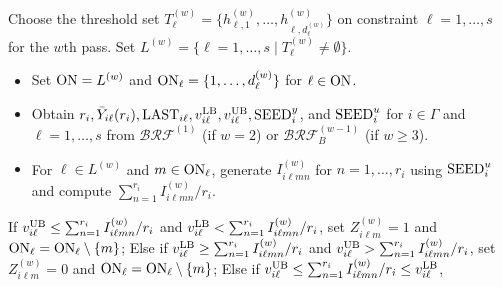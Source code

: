\documentclass[11pt]{article}
\begin{document}
\begin{algorithm}[h!]
{\fontsize{10}{13}\selectfont	
    \begin{algorithmic}
    \caption{The $w$th Pass of Procedure Bernoulli Recycled Feasibility, $\mathcal{BRF}_B^{(w)}$, where $w\geq 2$}
    \label{alg:berf_b}
		\State {\bf [Setup:]} Choose the threshold set $T_\ell^{(w)}=\{h_{\ell,1}^{(w)},\ldots,h_{\ell,d_\ell^{(w)}}^{(w)}\}$ on constraint $\ell=1,\ldots,s$ for the $w$th pass. Set $L^{(w)}=\{\ell=1,\ldots,s\mid T_\ell^{(w)}\not=\emptyset\}$. 
		\State [{\bf Initialization}:] 
		\begin{itemize}%
            \item Set ${\rm ON}=L^{(w)}$ and ${\rm ON}_\ell=\{1,\ldots,d_\ell^{(w)}\}$ for $\ell\in {\rm ON}$. 
            \item Obtain $r_i, \bar{Y}_{i\ell}(r_i), {\rm LAST}_{i\ell}, v_{i\ell}^{\rm LB}, v_{i\ell}^{\rm UB}, {\rm SEED}_i^y$, and ${\rm SEED}_i^u$ for $i\in\Gamma$ and $\ell=1,\ldots,s$ from $\mathcal{BRF}^{(1)}$ (if $w=2$) or  $\mathcal{BRF}_B^{(w-1)}$ (if $w\geq 3$). 
            \item For $\ell\in L^{(w)}$ and $m\in {\rm ON}_\ell$, generate $I_{i\ell m n}^{(w)}$ for $n=1,\ldots,r_i$ using ${\rm SEED}^u_i$ and compute $\sum_{n=1}^{r_i} I_{i\ell m n}^{(w)}/r_i$.
		\end{itemize}
        \State If $v_{i\ell}^{\rm UB}\leq \sum_{n=1}^{r_i} I_{i\ell m n}^{(w)}/r_i$ and $v_{i\ell}^{\rm LB}<\sum_{n=1}^{r_i} I_{i\ell m n}^{(w)}/r_i$, set $Z_{i\ell m}^{(w)}=1$ and ${\rm ON}_\ell={\rm ON}_\ell \setminus \{m\}$;
        \State Else if $v_{i\ell}^{\rm LB}\geq \sum_{n=1}^{r_i} I_{i\ell m n}^{(w)}/r_i$ and $v_{i\ell}^{\rm UB}>\sum_{n=1}^{r_i} I_{i\ell m n}^{(w)}/r_i$, set $Z_{i\ell m}^{(w)}=0$ and ${\rm ON}_\ell={\rm ON}_\ell \setminus \{m\}$;
        \State Else if $v_{i\ell}^{\rm UB}\leq \sum_{n=1}^{r_i} I_{i\ell m n}^{(w)}/r_i\leq v_{i\ell}^{\rm LB}$,
            \begin{itemize}[leftmargin=2.5cm]

\end{itemize}
\end{algorithmic}}
\end{algorithm}
\end{document}
